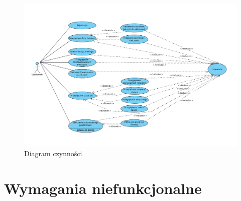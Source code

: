 \begin{figure}[H]
\centering
\includegraphics[width=\textwidth, keepaspectratio=true]{grafika/diagram_przebiegu.png} 
	\caption{ Diagram czynności }
\end{figure}
\newpage

\section{Wymagania niefunkcjonalne}